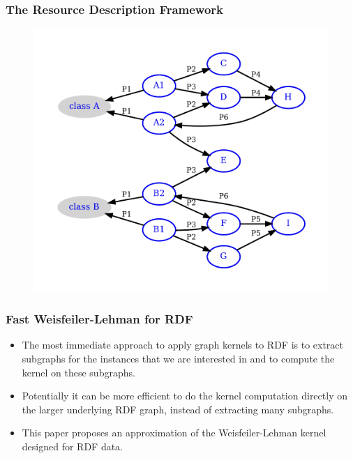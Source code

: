 \documentclass{beamer}
\begin{document}

\begin{frame}
\frametitle{The Resource Description Framework}

\begin{center}
\begin{figure}
\includegraphics[scale=0.55,keepaspectratio,right]{img/07-Graph}
\end{figure}
\end{center}

\end{frame}


\begin{frame}
\frametitle{Fast Weisfeiler-Lehman for RDF}

\begin{itemize}
\item
The most immediate approach to apply graph kernels to RDF is to extract subgraphs for the instances that we are interested in and to compute the kernel on these subgraphs.

\item
Potentially it can be more efficient to do the kernel computation directly on the larger underlying RDF graph, instead of extracting many subgraphs.

\item
This paper proposes an approximation of the Weisfeiler-Lehman kernel designed for RDF data.
\end{itemize}

\end{frame}
\end{document}
